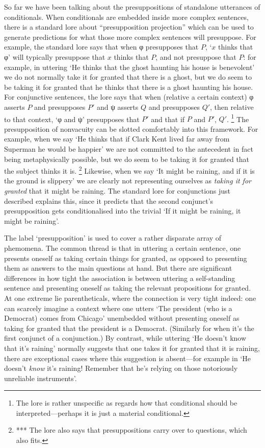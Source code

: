 \documentclass[If.tex]{subfiles}
\begin{document}
\begin{prop}
So far we have been talking about the presuppositions of standalone utterances of conditionals. When conditionals are embedded inside more complex sentences, there is a standard lore about “presupposition projection” which can be used to generate predictions for what those more complex sentences will presuppose. For example, the standard lore says that when φ presupposes that $P$, ‘$x$ thinks that φ’ will typically presuppose that $x$ thinks that $P$, and not presuppose that $P$: for example, in uttering ‘He thinks that the ghost haunting his house is benevolent’ we do not normally take it for granted that there is a ghost, but we do seem to be taking it for granted that he thinks that there is a ghost haunting his house. For conjunctive sentences, the lore says that when (relative a certain context) φ asserts $P$ and presupposes $P'$ and ψ asserts $Q$ and presupposes $Q'$, then relative to that context, ‘φ and ψ’ presupposes that $P'$ and that if $P$ and $P'$, $Q'$.%
\footnote{The lore is rather unspecific as regards how that conditional should be interpreted---perhaps it is just a material conditional.}
 The presupposition of nonvacuity can be slotted comfortably into this framework. For example, when we say ‘He thinks that if Clark Kent lived far away from Superman he would be happier’ we are not committed to the antecedent in fact being metaphysically possible, but we do seem to be taking it for granted that the subject thinks it is.%
\footnote{*** The lore also says that presuppositions carry over to questions, which also fits.}
 Likewise, when we say ‘It might be raining, and if it is the ground is slippery’ we are clearly not representing ourselves as \emph{taking it for granted} that it might be raining. The standard lore for conjunctions just described explains this, since it predicts that the second conjunct's presupposition gets conditionalised into the trivial ‘If it might be raining, it might be raining’.

The label ‘presupposition’ is used to cover a rather disparate array of phemomena. The common thread is that in uttering a certain sentence, one presents oneself as taking certain things for granted, as opposed to presenting them as answers to the main questions at hand. But there are significant differences in how tight the association is between uttering a self-standing sentence and presenting oneself as taking the relevant propositions for granted. At one extreme lie parentheticals, where the connection is very tight indeed: one can scarcely imagine a context where one utters ‘The president (who is a Democrat) comes from Chicago’ unembedded without presenting oneself as taking for granted that the president is a Democrat. (Similarly for when it's the first conjunct of a conjunction.) By contrast, while uttering ‘He doesn't know that it's raining’ normally suggests that one takes it for granted that it is raining, there are exceptional cases where this suggestion is absent---for example in ‘He doesn't \emph{know} it's raining! Remember that he's relying on those notoriously unreliable instruments’.


\end{prop}
\end{document}
